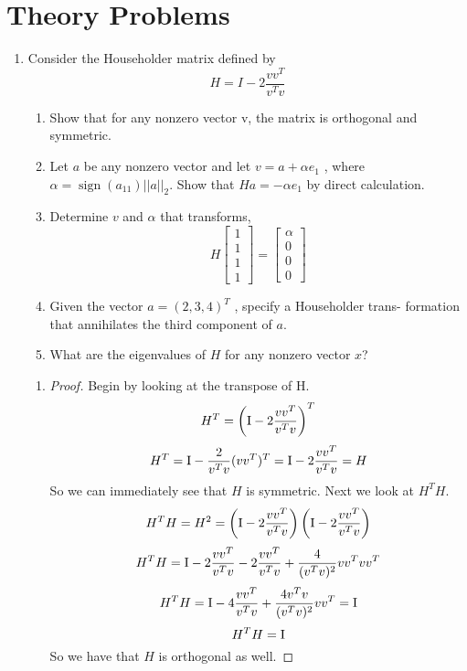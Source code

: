 \documentclass{article}
\DeclareMathOperator{\sign}{sign}
\begin{document}
\section{Theory Problems}
\begin{enumerate}

\item %
Consider the Householder matrix defined by
\[
    H = I - 2\frac{vv^T}{v^Tv}
\] 
\begin{enumerate}
\item Show that for any nonzero vector v, the matrix is orthogonal
and symmetric.

\item  Let $a$ be any nonzero vector and let $v = a + \alpha e_1$ , where
$\alpha = \sign(a_{11})||a||_2 $. Show that $Ha = -\alpha e_1$ by direct calculation.

\item Determine $v$ and $\alpha$ that transforms,
\[
    H \left[\begin{array}{c} 1 \\1 \\1\\1\end{array}\right] = \left[\begin{array}{c} \alpha \\0\\0\\0\end{array}\right]
\]
\item Given the vector $a = (2, 3, 4)^T$ , specify a Householder trans-
formation that annihilates the third component of $a$.

\item What are the eigenvalues of $H$ for any nonzero vector $x$?
\end{enumerate}

\begin{enumerate}

\item 
\begin{proof}
Begin by looking at the transpose of H. 
\[
    H^T = \left(\mathrm{I} - 2\frac{vv^T}{v^Tv}\right)^T
\]
\[
    H^T = \mathrm{I} - \frac{2}{v^Tv} (vv^T)^T = \mathrm{I} - 2\frac{vv^T}{v^Tv} = H
\]
So we can immediately see that $H$ is symmetric. Next we look at $H^TH$.
\[
    H^TH = H^2 = \left(\mathrm{I} - 2\frac{vv^T}{v^Tv}\right)\left(\mathrm{I} - 2\frac{vv^T}{v^Tv}\right)
\]
\[
    H^TH = \mathrm{I} - 2\frac{vv^T}{v^Tv} - 2\frac{vv^T}{v^Tv} + \frac{4}{(v^Tv)^2} vv^Tvv^T
\]
\[
    H^TH = \mathrm{I} - 4\frac{vv^T}{v^Tv} + \frac{4 v^Tv}{(v^Tv)^2}vv^T = \mathrm{I}
\]
\[
    H^TH = \mathrm{I}
\]
So we have that $H$ is orthogonal as well. 
\end{proof}



\end{enumerate}
\end{enumerate}
\end{document}
